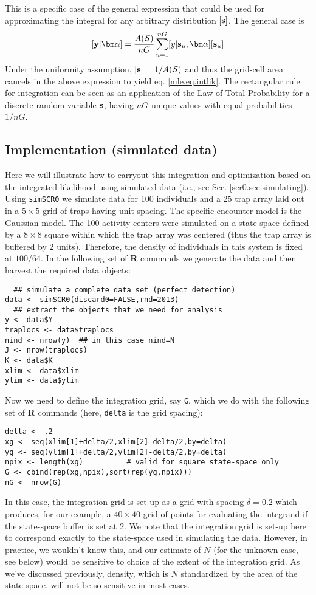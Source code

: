 This is a specific case of the general expression that could be used
for approximating the integral for any arbitrary 
distribution $[{\bf s}]$. The general case is
\[
[{\bf y}|{\bm \alpha}]  = \frac{A({\cal S})}{nG} \sum_{u=1}^{nG} [y|{\bf s}_{u},{\bm \alpha}] [{\bf s}_{u}]
\]
Under the uniformity assumption,
 $[{\bf s}] = 1/A({\cal S})$
and thus the grid-cell area cancels in the above
expression to yield eq. \ref{mle.eq.intlik}.
The rectangular rule for integration can be seen as an application of
the Law of Total Probability for a discrete random variable ${\bf
  s}$, having $nG$ 
unique values with equal probabilities $1/nG$.


\subsection{Implementation (simulated data)}

Here we will illustrate how to carryout this integration and
optimization based on the integrated likelihood using simulated data
 (i.e., see Sec. \ref{scr0.sec.simulating}). Using \mbox{\tt simSCR0}
 we simulate data for 100 individuals and a 25 trap array
laid out in a $5 \times 5$ grid of traps having unit spacing.  The specific encounter
model is the Gaussian model. The 100 activity centers were
simulated on a state-space defined by a $8 \times 8$ square 
within which the
trap array was centered (thus the trap array is buffered by 2
units). Therefore, the density of individuals in this system is fixed
at $100/64$.
In the following set of {\bf R} commands we generate the data and 
then harvest the required data objects:
{\small
\begin{verbatim}
  ## simulate a complete data set (perfect detection)
data <- simSCR0(discard0=FALSE,rnd=2013)
  ## extract the objects that we need for analysis
y <- data$Y
traplocs <- data$traplocs
nind <- nrow(y)  ## in this case nind=N
J <- nrow(traplocs)
K <- data$K
xlim <- data$xlim
ylim <- data$ylim
\end{verbatim}
}
{\flushleft Now } we need to define the integration grid, say
\mbox{\tt G}, which we do with
the following set of {\bf R} commands (here, \mbox{\tt delta} is the grid spacing):
{\small
\begin{verbatim}
delta <- .2
xg <- seq(xlim[1]+delta/2,xlim[2]-delta/2,by=delta) 
yg <- seq(ylim[1]+delta/2,ylim[2]-delta/2,by=delta) 
npix <- length(xg)          # valid for square state-space only
G <- cbind(rep(xg,npix),sort(rep(yg,npix)))
nG <- nrow(G)
\end{verbatim}
}
{\flushleft In this case}, the integration grid is set up as a grid with spacing
$\delta = 0.2$ which produces, for our example, a $40 \times 40$ grid of points for evaluating the
integrand if the state-space buffer is set at 2. We note that the
integration grid is set-up here to correspond exactly to the
state-space used in simulating the data. However, in practice, we
wouldn't know this, and our estimate of $N$ (for the unknown case, see
below) would be sensitive to choice of the extent of the integration
grid. As we've discussed previously, density, which is $N$
standardized by the area of the state-space, will not be so sensitive
in most cases. 

